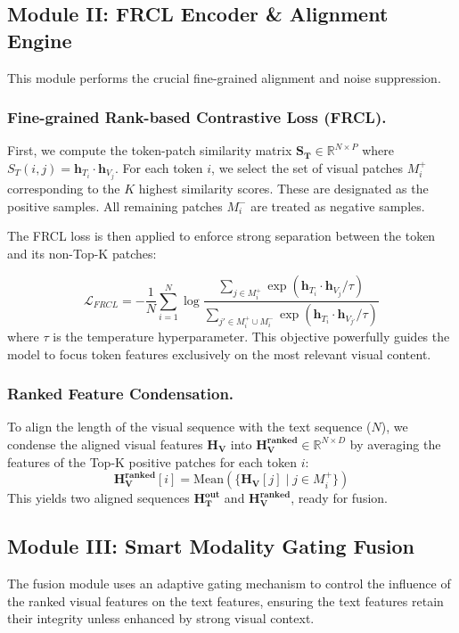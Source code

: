 \documentclass[runningheads]{llncs}
\begin{document}
\subsection{Module II: FRCL Encoder \& Alignment Engine}

This module performs the crucial fine-grained alignment and noise suppression.

\subsubsection{Fine-grained Rank-based Contrastive Loss (FRCL).}
First, we compute the token-patch similarity matrix $\mathbf{S_T} \in \mathbb{R}^{N \times P}$ where $S_T(i, j) = \mathbf{h}_{T_i} \cdot \mathbf{h}_{V_j}$. For each token $i$, we select the set of visual patches $M_i^+$ corresponding to the $K$ highest similarity scores. These are designated as the positive samples. All remaining patches $M_i^-$ are treated as negative samples.

The FRCL loss is then applied to enforce strong separation between the token and its non-Top-K patches:

\begin{equation}
\label{eq:frcl}
\mathcal{L}_{FRCL} = - \frac{1}{N} \sum_{i=1}^{N} \log \frac{\sum_{j \in M_i^+} \exp(\mathbf{h}_{T_i} \cdot \mathbf{h}_{V_j} / \tau)}{\sum_{j' \in M_i^+ \cup M_i^-} \exp(\mathbf{h}_{T_i} \cdot \mathbf{h}_{V_{j'}} / \tau)}
\end{equation}
where $\tau$ is the temperature hyperparameter. This objective powerfully guides the model to focus token features exclusively on the most relevant visual content.


\subsubsection{Ranked Feature Condensation.}
To align the length of the visual sequence with the text sequence ($N$), we condense the aligned visual features $\mathbf{H_V}$ into $\mathbf{H_{V}^{ranked}} \in \mathbb{R}^{N \times D}$ by averaging the features of the Top-K positive patches for each token $i$:
\begin{equation}
\label{eq:condensation}
\mathbf{H_{V}^{ranked}}[i] = \text{Mean}(\{\mathbf{H_V}[j] \mid j \in M_i^+\})
\end{equation}
This yields two aligned sequences $\mathbf{H_{T}^{out}}$ and $\mathbf{H_{V}^{ranked}}$, ready for fusion.

\subsection{Module III: Smart Modality Gating Fusion}
The fusion module uses an adaptive gating mechanism to control the influence of the ranked visual features on the text features, ensuring the text features retain their integrity unless enhanced by strong visual context.
\end{document}
